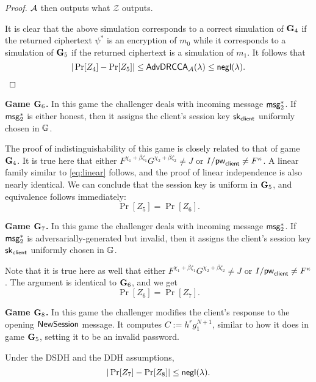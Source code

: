 \begin{proof}
	$\mathcal{A}$ then outputs what $\mathcal{Z}$ outputs.

	It is clear that the above simulation corresponds to a correct simulation of $\mathbf{G}_4$ if the returned ciphertext $\psi^{*}$ is an encryption of $m_0$ while it corresponds to a simulation of $\mathbf{G}_5$ if the returned ciphertext is a simulation of $m_1$. It follows that $$|\Pr[Z_4]-\Pr[Z_5]|\leq\mathsf{AdvDRCCA}_{\mathcal{A}}(\lambda)\leq \mathsf{negl}(\lambda).$$ 
\end{proof}

\textbf{Game $\mathbf{G}_6$.} In this game the challenger deals with incoming message $\mathsf{msg}_{2}^{*}$. If $\mathsf{msg}_{2}^{*}$ is either honest, then it assigns the client's session key $\mathsf{sk}_{\mathsf{client}}$ uniformly chosen in $\mathbb{G}$.

The proof of indistinguishability of this game is closely related to that of game $\mathbf{G}_4$. It is true here that either $F^{\chi_1+\beta\zeta_1}G^{\chi_2+\beta\zeta_2}\neq J$ or $I/\mathsf{pw}_{\mathsf{client}}\neq F^\kappa$. A linear family similar to \cref{eq:linear} follows, and the proof of linear independence is also nearly identical. We can conclude that the session key is uniform in $\mathbf{G}_5$, and equivalence follows immediately: $$\Pr[Z_5]=\Pr[Z_6].$$

\textbf{Game $\mathbf{G}_7$.} In this game the challenger deals with incoming message $\mathsf{msg}_{2}^{*}$. If $\mathsf{msg}_{2}^{*}$ is adversarially-generated but invalid, then it assigns the client's session key $\mathsf{sk}_{\mathsf{client}}$ uniformly chosen in $\mathbb{G}$.

Note that it is true here as well that either $F^{\chi_1+\beta\zeta_1}G^{\chi_2+\beta\zeta_2}\neq J$ or $I/\mathsf{pw}_{\mathsf{client}}\neq F^\kappa$. The argument is identical to $\mathbf{G}_6$, and we get $$\Pr[Z_6]=\Pr[Z_7].$$

\textbf{Game $\mathbf{G}_8$.} In this game the challenger modifies the client's response to the opening $\mathsf{NewSession}$ message. It computes $C:=h^{r}g_1^{N+1}$, similar to how it does in game $\mathbf{G}_5$, setting it to be an invalid password. 

\begin{lemma}
	Under the DSDH and the DDH assumptions, $$|\Pr[Z_7]-\Pr[Z_8]|\leq\mathsf{negl}(\lambda).$$
\end{lemma}

